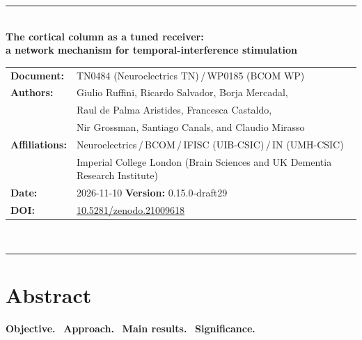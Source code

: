 \documentclass[a4paper]{article}
\newif\ifjne
\newif\ifsupp
\newcommand{\paperver}{0.15.0-draft29}
\begin{document}
\else
\begin{flushleft}
{\color{neblue}\rule{\textwidth}{2pt}}\\[4pt]
{\LARGE\bfseries The cortical column as a tuned receiver:\\[2pt]
a network mechanism for temporal-interference stimulation}\\[10pt]
\begin{tabular}{@{}ll@{}}
\textbf{Document:} & TN0484 (Neuroelectrics TN)\,/\,WP0185 (BCOM WP) \\
\textbf{Authors:} & Giulio Ruffini, Ricardo Salvador, Borja Mercadal,\\
& Raul de Palma Aristides, Francesca Castaldo,\\
& Nir Grossman, Santiago Canals, and Claudio Mirasso \\
\textbf{Affiliations:} & Neuroelectrics\,/\,BCOM\,/\,IFISC (UIB-CSIC)\,/\,IN (UMH-CSIC)\\
& Imperial College London (Brain Sciences and UK Dementia Research Institute) \\
\textbf{Date:} & 2026-11-10 \qquad \textbf{Version:} \paperver \\
\textbf{DOI:} & \href{https://doi.org/10.5281/zenodo.21009618}{10.5281/zenodo.21009618} \\
\end{tabular}\\[4pt]
{\color{neblue}\rule{\textwidth}{1pt}}
\end{flushleft}
\fi

\ifsupp
\begin{center}
{\large\bfseries Supplementary Material}\\[4pt]
\begin{minipage}{0.86\textwidth}\centering\small
Additional methods, derivations, and figures accompanying the article. Sections, equations, and figures use S-prefixed numbers;
references to article equations are marked as main-text references.
\end{minipage}
\end{center}
\vspace{8pt}
\tableofcontents
\clearpage
\fi

\ifsupp\else
\section*{Abstract}

\noindent
\ifjne
\textbf{Objective.} \absObjective\
\textbf{Approach.} \absApproach\
\textbf{Main results.} \absResults\
\textbf{Significance.} \absSignificance
\else
\absObjective\ \absApproach\ \absResults\ \absSignificance
\fi
\end{document}
